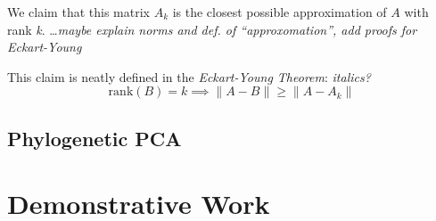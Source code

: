 \documentclass[12pt]{article}
\theoremstyle{definition}
\begin{document}
We claim that this matrix $A_k$ is the closest possible approximation of $A$ with rank \textit{k}.
\ldots \textit{maybe explain norms and def. of ``approxomation'', add proofs for Eckart-Young}

This claim is neatly defined in the \textit{Eckart-Young Theorem}: 
\textit{italics?}
\begin{equation}
	\mathrm{rank}(B) = k \implies \|A - B\| \ge \|A - A_k\|
	\label{eq:Eckart-Young}
\end{equation}

\subsection{Phylogenetic PCA}



\cite{sommer}

\section{Demonstrative Work}




\printbibliography
\end{document}
